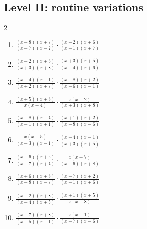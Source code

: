 \documentclass[11pt,oneside]{book}
\begin{document}
\subsection*{Level II: routine variations}
\begin{multicols}{2}
\begin{enumerate}[leftmargin=*,label=\textbf{\arabic*.},itemsep=0.65\baselineskip]
\item $\displaystyle \frac{\left(x - 8\right) \left(x + 7\right)}{\left(x - 7\right) \left(x - 2\right)}\cdot\frac{\left(x - 2\right) \left(x + 6\right)}{\left(x - 1\right) \left(x + 7\right)}$
\item $\displaystyle \frac{\left(x - 2\right) \left(x + 6\right)}{\left(x + 3\right) \left(x + 8\right)}\cdot\frac{\left(x + 3\right) \left(x + 5\right)}{\left(x - 4\right) \left(x + 6\right)}$
\item $\displaystyle \frac{\left(x - 4\right) \left(x - 1\right)}{\left(x + 2\right) \left(x + 7\right)}\cdot\frac{\left(x - 8\right) \left(x + 2\right)}{\left(x - 6\right) \left(x - 1\right)}$
\item $\displaystyle \frac{\left(x + 5\right) \left(x + 8\right)}{x \left(x - 4\right)}\cdot\frac{x \left(x + 2\right)}{\left(x + 3\right) \left(x + 8\right)}$
\item $\displaystyle \frac{\left(x - 8\right) \left(x - 4\right)}{\left(x - 1\right) \left(x + 1\right)}\cdot\frac{\left(x + 1\right) \left(x + 2\right)}{\left(x - 8\right) \left(x - 6\right)}$
\item $\displaystyle \frac{x \left(x + 5\right)}{\left(x - 3\right) \left(x - 1\right)}\cdot\frac{\left(x - 4\right) \left(x - 1\right)}{\left(x + 3\right) \left(x + 5\right)}$
\item $\displaystyle \frac{\left(x - 6\right) \left(x + 5\right)}{\left(x - 7\right) \left(x + 4\right)}\cdot\frac{x \left(x - 7\right)}{\left(x - 6\right) \left(x + 8\right)}$
\item $\displaystyle \frac{\left(x + 6\right) \left(x + 8\right)}{\left(x - 8\right) \left(x - 7\right)}\cdot\frac{\left(x - 7\right) \left(x + 2\right)}{\left(x - 1\right) \left(x + 6\right)}$
\item $\displaystyle \frac{\left(x - 2\right) \left(x + 8\right)}{\left(x - 4\right) \left(x + 5\right)}\cdot\frac{\left(x + 1\right) \left(x + 5\right)}{x \left(x + 8\right)}$
\item $\displaystyle \frac{\left(x - 7\right) \left(x + 8\right)}{\left(x - 5\right) \left(x - 1\right)}\cdot\frac{x \left(x - 1\right)}{\left(x - 7\right) \left(x - 6\right)}$
\end{enumerate}
\end{multicols}
\end{document}
